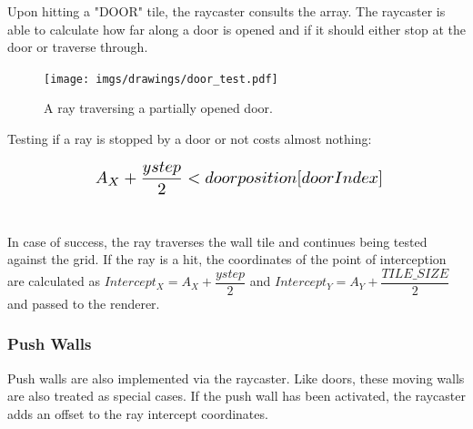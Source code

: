 \par
Upon hitting a "DOOR" tile, the raycaster consults the  array. The raycaster is able to calculate how far along a door is opened and if it should either stop at the door or traverse through.\\

\begin{minipage}{\textwidth}

\end{minipage}

\par 
 \par
\begin{figure}[H]
  \centering
 \texttt{[image: imgs/drawings/door\_test.pdf]}
 \caption{A ray traversing a partially opened door.}
\end{figure}
\par
Testing if a ray is stopped by a door or not costs almost nothing:\\
\par

\begin{equation*}
    \scalebox{1.3}{
$A_{X} + \dfrac{ystep}{2} < doorposition[doorIndex]$\\
}
\end{equation*}\\
\par
 In case of success, the ray traverses the wall tile and continues being tested against the grid. If the ray is a hit, the coordinates of the point of interception are calculated as $Intercept_{X} = A_{X} + \dfrac{ystep}{2}$ and $Intercept_{Y} = A_{Y} + \dfrac{TILE\_SIZE}{2}$ and passed to the renderer.












\subsubsection{Push Walls} 
Push walls are also implemented via the raycaster. Like doors, these moving walls are also treated as special cases. If the push wall has been activated, the raycaster adds an offset to the ray intercept coordinates.

















